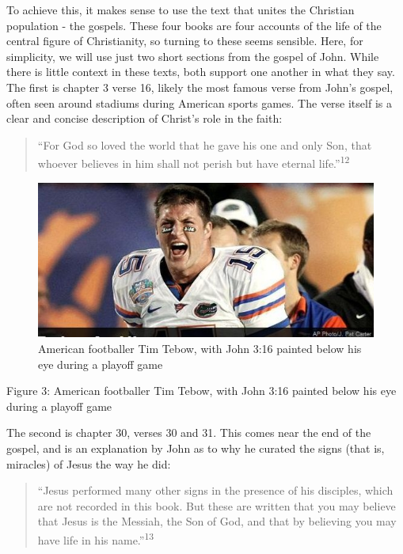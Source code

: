 \documentclass[]{article}
\begin{document}
To achieve this, it makes sense to use the text that unites the
Christian population - the gospels. These four books are four accounts
of the life of the central figure of Christianity, so turning to these
seems sensible. Here, for simplicity, we will use just two short
sections from the gospel of John. While there is little context in these
texts, both support one another in what they say. The first is chapter 3
verse 16, likely the most famous verse from John's gospel, often seen
around stadiums during American sports games. The verse itself is a
clear and concise description of Christ's role in the faith:

\begin{quote}
``For God so loved the world that he gave his one and only Son, that
whoever believes in him shall not perish but have eternal
life.''\textsuperscript{12}
\end{quote}

\begin{figure}
\centering
\includegraphics{./TimTebow.jpg}
\caption{American footballer Tim Tebow, with John 3:16 painted below his
eye during a playoff game}
\end{figure}

Figure 3: American footballer Tim Tebow, with John 3:16 painted below
his eye during a playoff game

The second is chapter 30, verses 30 and 31. This comes near the end of
the gospel, and is an explanation by John as to why he curated the signs
(that is, miracles) of Jesus the way he did:

\begin{quote}
``Jesus performed many other signs in the presence of his disciples,
which are not recorded in this book. But these are written that you may
believe that Jesus is the Messiah, the Son of God, and that by believing
you may have life in his name.''\textsuperscript{13}
\end{quote}
\end{document}
